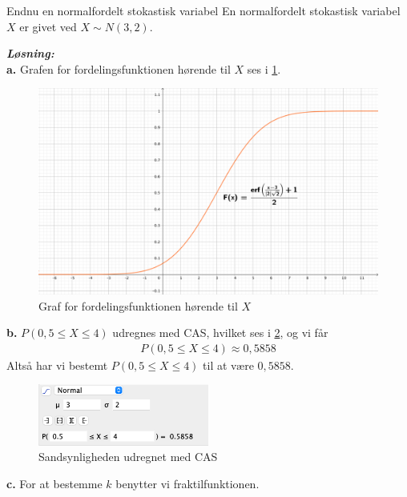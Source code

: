 \documentclass{article}
\newcommand{\sol}{\setlength{\parindent}{0cm}\textbf{\textit{Løsning:}}\setlength{\parindent}{1cm}}
\begin{document}
\begin{question}{Endnu en normalfordelt stokastisk variabel}{}
  En normalfordelt stokastisk variabel $X$ er givet ved $X \sim N(3,2)$.
\end{question}
\sol \\
\textbf{a.}
Grafen for fordelingsfunktionen hørende til $X$ ses i \cref{fig:fordeling}.
\begin{figure}[H]
\begin{center}
  \includegraphics[width=\textwidth]{fordeling.png}
\end{center}
\caption{Graf for fordelingsfunktionen hørende til $X$}
\label{fig:fordeling}
\end{figure}
\noindent \textbf{b.}
$P(0,5 \leq X \leq 4)$ udregnes med CAS, hvilket ses i \cref{fig:CASleq4}, og vi får
\begin{equation*}
\begin{split}
P(0,5 \leq X \leq 4) \approx 0,5858
\end{split}
\end{equation*}
Altså har vi bestemt $P(0,5 \leq X \leq 4)$ til at være $0,5858$. 
\begin{figure}[H]
\begin{center}
  \includegraphics[width=0.5\textwidth]{CASleq4.png}
\end{center}
\caption{Sandsynligheden udregnet med CAS}
\label{fig:CASleq4}
\end{figure}
\noindent \textbf{c.}
For at bestemme $k$ benytter vi fraktilfunktionen. 
\end{document}
